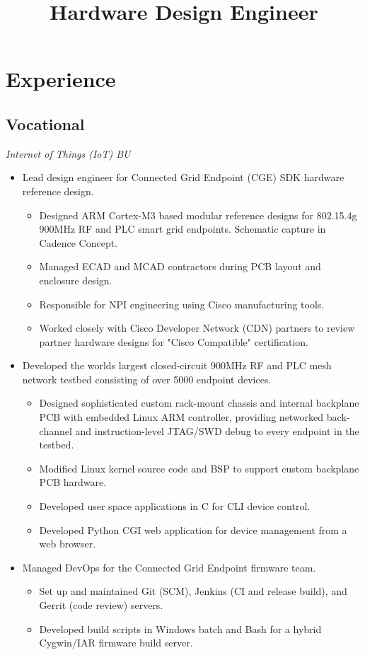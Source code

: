 \documentclass[11pt,a4paper]{moderncv}
\title{Hardware Design Engineer}
\begin{document}
\makecvtitle

\section{Experience}
\subsection{Vocational}
{
  \textit{Internet of Things (IoT) BU}
  \begin{itemize}
  \item Lead design engineer for Connected Grid Endpoint (CGE) SDK hardware reference design.
    \begin{itemize}
      \item Designed ARM Cortex-M3 based modular reference designs for 802.15.4g 900MHz RF and PLC smart grid endpoints.  Schematic capture in Cadence Concept.
      \item Managed ECAD and MCAD contractors during PCB layout and enclosure design.
      \item Responsible for NPI engineering using Cisco manufacturing tools.
      \item Worked closely with Cisco Developer Network (CDN) partners to review partner hardware designs for "Cisco Compatible" certification.
    \end{itemize}
  \item Developed the worlds largest closed-circuit 900MHz RF and PLC mesh network testbed consisting of over 5000 endpoint devices.
    \begin{itemize}
    \item Designed sophisticated custom rack-mount chassis and internal backplane PCB with embedded Linux ARM controller, providing networked back-channel and instruction-level JTAG/SWD debug to every endpoint in the testbed.
    \item Modified Linux kernel source code and BSP to support custom backplane PCB hardware.
    \item Developed user space applications in C for CLI device control.
    \item Developed Python CGI web application for device management from a web browser.
    \end{itemize}
  \item Managed DevOps for the Connected Grid Endpoint firmware team.
    \begin{itemize}
    \item Set up and maintained Git (SCM), Jenkins (CI and release build), and Gerrit (code review) servers.
    \item Developed build scripts in Windows batch and Bash for a hybrid Cygwin/IAR firmware build server.
    \end{itemize}
  \end{itemize}
}
\end{document}
